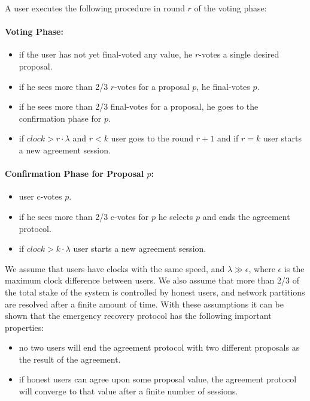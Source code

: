 A user executes the following procedure
in round $r$ of the voting phase:

\paragraph{Voting Phase:}
\begin{itemize}
    \item if the user has not yet final-voted any value, he $r$-votes a single desired proposal.
    \item if he sees more than 2/3 $r$-votes for a proposal $p$, he final-votes $p$.
    \item if he sees more than 2/3 final-votes for a proposal, he goes to the confirmation phase for $p$.
    \item if $clock > r \cdot \lambda$ and $r < k$ user goes to the round $r + 1$ and if $r = k$ user starts a
    new agreement session.
\end{itemize}

\paragraph{Confirmation Phase for Proposal $p$:}
\begin{itemize}
    \item user c-votes $p$.
    \item if he sees more than 2/3 c-votes for $p$ he selects $p$ and ends the agreement protocol.
    \item if $clock > k \cdot \lambda$ user starts a new agreement session.
\end{itemize}

We assume that users have clocks with the same speed, and $\lambda \gg \epsilon$, where $\epsilon$ is the maximum
clock difference between users. We also assume that more than 2/3 of the total stake of the system is controlled
by honest users, and network partitions are resolved after a finite amount of time. With these assumptions it can be
shown that the emergency recovery protocol has the following important properties:
\begin{itemize}
    \item no two users will end the agreement protocol with two different proposals as the result of the agreement.
    \item if honest users can agree upon some proposal value, the agreement protocol will converge to that value
    after a finite number of sessions.
\end{itemize}

